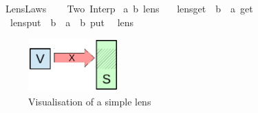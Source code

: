%
\begin{isabellebody}%
%
%
\isamarkuptrue%
%
\isadelimtheory
%
\endisadelimtheory
%
\isatagtheory
{}\isamarkupfalse%
\ Lens{\isacharunderscore}Laws\isanewline
{}\ \isanewline
\ \ Two\ Interp\isanewline
{}%
\endisatagtheory
{\isafoldtheory}%
%
\isadelimtheory
%
\endisadelimtheory
%
\isamarkuptrue%
\isamarkupfalse%
\ {\isacharparenleft}{\isacharprime}a{\isacharcomma}\ {\isacharprime}b{\isacharparenright}\ lens\ {\isacharequal}\isanewline
\ \ lens{\isacharunderscore}get\ {\isacharcolon}{\isacharcolon}\ {\isachardoublequoteopen}{\isacharprime}b\ {\isasymRightarrow}\ {\isacharprime}a{\isachardoublequoteclose}\ {\isacharparenleft}{\isachardoublequoteopen}get{\isasymindex}{\isachardoublequoteclose}{\isacharparenright}\isanewline
\ \ lens{\isacharunderscore}put\ {\isacharcolon}{\isacharcolon}\ {\isachardoublequoteopen}{\isacharprime}b\ {\isasymRightarrow}\ {\isacharprime}a\ {\isasymRightarrow}\ {\isacharprime}b{\isachardoublequoteclose}\ {\isacharparenleft}{\isachardoublequoteopen}put{\isasymindex}{\isachardoublequoteclose}{\isacharparenright}\isanewline
\isanewline
{}\isamarkupfalse%
\isanewline
\ \ lens\ {\isacharparenleft}\ {\isachardoublequoteopen}{\isasymLongrightarrow}{\isachardoublequoteclose}\ {}{\isacharparenright}%
\begin{isamarkuptext}%
\begin{figure}
  \begin{center}
    \includegraphics[width=3.5cm]{figures/Lens}
  \end{center}
  \vspace{-5ex}
  \caption{Visualisation of a simple lens}
  \label{fig:Lens}
  \end{figure}


\end{isamarkuptext}
\end{isabellebody}
